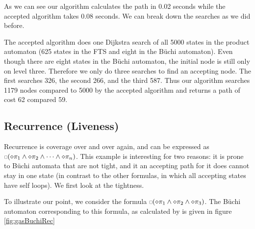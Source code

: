 As we can see our algorithm calculates the path in 0.02 seconds while the accepted algorithm takes 0.08 seconds. We can break down the searches as we did before. 

The accepted algorithm does one Dijkstra search of all 5000 states in the product automaton (625 states in the FTS and eight in the B\"uchi automaton). Even though there are eight states in the B\"uchi automaton, the initial node is still only on level three. Therefore we only do three searches to find an accepting node. The first searches 326, the second 266, and the third 587. Thus our algorithm searches 1179 nodes compared to 5000 by the accepted algorithm and returns a path of cost 62 compared 59.
\subsection{Recurrence (Liveness)}
Recurrence is coverage over and over again, and can be expressed as $\ssquare(\diamond \pi_1 \land \diamond \pi_2 \land \dots \land \diamond \pi_n)$. This example is interesting for two reasons: it is prone to B\"{u}chi automata that are not tight, and it an accepting path for it does cannot stay in one state (in contrast to the other formulas, in which all accepting states have self loops). We first look at the tightness.

To illustrate our point, we consider the formula $\ssquare(\diamond \pi_1 \land \diamond \pi_2 \land \diamond \pi_3)$. The B\"{u}chi automaton corresponding to this formula, as calculated by \cite{gastin01} is given in figure \ref{fig:gasBuchiRec}

